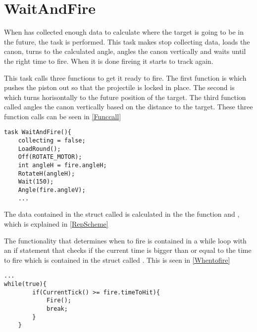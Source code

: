 \section{WaitAndFire}
When \name has collected enough data to calculate where the target is going to
be in the future, the task  is performed. This task makes
\name stop collecting data, loads the canon, turns to the calculated angle, angles the
canon vertically and waits until the right time to fire. When it is done fireing
it starts to track again.\nl

This task calls three functions to get it ready to fire. The first function is
 which pushes the piston out so that the projectile is locked
in place. The second is  which turns \name horisontally to the
future position of the target. The third function called  angles
the canon vertically based on the distance to the target. These three function calls can be seen in
\autoref{Funccall}\nl

\begin{minipage}[H]{\linewidth}
\begin{lstlisting}[caption = Function calls in WaitAndFire, label = Funccall,
style = nc] 
task WaitAndFire(){
    collecting = false;
    LoadRound();
    Off(ROTATE_MOTOR);
    int angleH = fire.angleH;
    RotateH(angleH);
    Wait(150);
    Angle(fire.angleV);
    ...
\end{lstlisting}
\end{minipage}

The data contained in the struct called  is calculated in the the
function  and , which is explained in
\autoref{RepScheme}

The functionality that determines when to fire is contained in a while loop with
an if statement that checks if the current time is bigger than or equal to the
time to fire which is contained in the struct called . This is seen
in \autoref{Whentofire}\nl
 
\begin{minipage}[H]{\linewidth}
\begin{lstlisting}[caption = While loop that determines when to fire, label =
Whentofire, style = nc] ...
while(true){
        if(CurrentTick() >= fire.timeToHit){
            Fire();
            break;
        }
    }
\end{lstlisting}
\end{minipage}





